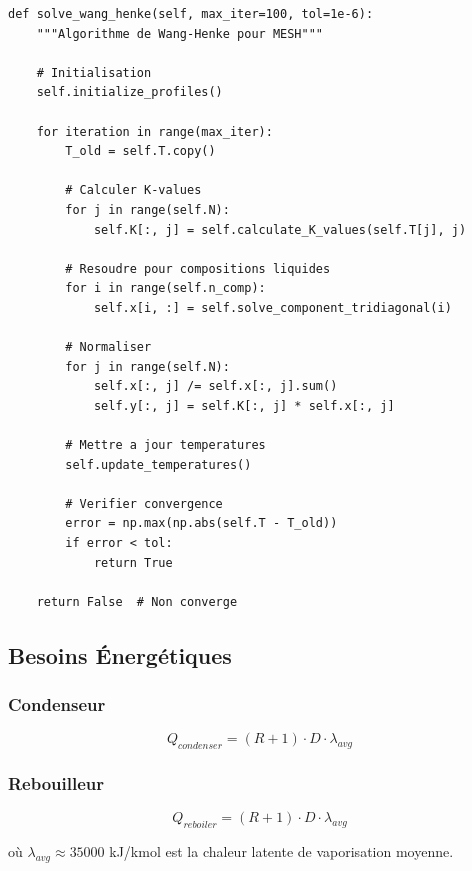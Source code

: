 \documentclass[11pt,a4paper]{article}
\begin{document}
\begin{lstlisting}[caption=Boucle principale Wang-Henke dans mesh\_solver.py]
def solve_wang_henke(self, max_iter=100, tol=1e-6):
    """Algorithme de Wang-Henke pour MESH"""

    # Initialisation
    self.initialize_profiles()

    for iteration in range(max_iter):
        T_old = self.T.copy()

        # Calculer K-values
        for j in range(self.N):
            self.K[:, j] = self.calculate_K_values(self.T[j], j)

        # Resoudre pour compositions liquides
        for i in range(self.n_comp):
            self.x[i, :] = self.solve_component_tridiagonal(i)

        # Normaliser
        for j in range(self.N):
            self.x[:, j] /= self.x[:, j].sum()
            self.y[:, j] = self.K[:, j] * self.x[:, j]

        # Mettre a jour temperatures
        self.update_temperatures()

        # Verifier convergence
        error = np.max(np.abs(self.T - T_old))
        if error < tol:
            return True

    return False  # Non converge
\end{lstlisting}

\subsection{Besoins Énergétiques}

\subsubsection{Condenseur}

\begin{equation}
Q_{condenser} = (R + 1) \cdot D \cdot \lambda_{avg}
\end{equation}

\subsubsection{Rebouilleur}

\begin{equation}
Q_{reboiler} = (R + 1) \cdot D \cdot \lambda_{avg}
\end{equation}

où $\lambda_{avg} \approx 35000$ kJ/kmol est la chaleur latente de vaporisation moyenne.
\end{document}

